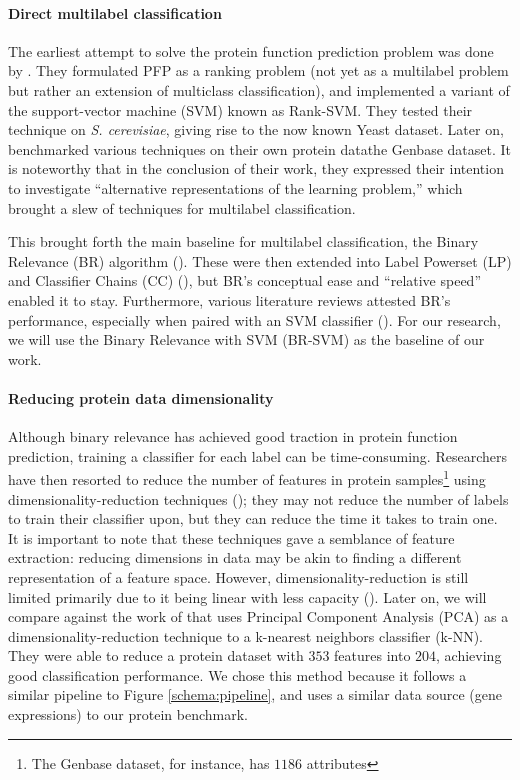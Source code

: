 \paragraph{Direct multilabel classification}
The earliest attempt to solve the protein function prediction problem was
done by \cite{elisseeff2001kernel}. They formulated PFP as a ranking problem
(not yet as a multilabel problem but rather an extension of multiclass
classification), and implemented a variant of the support-vector machine
(SVM) known as Rank-SVM. They tested their technique on \textit{S.
cerevisiae}, giving rise to the now known Yeast dataset. Later on,
\cite{diplaris2005protein} benchmarked various techniques on their own
protein data\textemdash the Genbase dataset. It is noteworthy that in the
conclusion of their work, they expressed their intention to investigate
``alternative representations of the learning problem,'' which brought a slew
of techniques for multilabel classification.

\par This brought forth the main baseline for multilabel classification, the
Binary Relevance (BR) algorithm
(\cite{godbole2004discriminative,tsoumakas2007multilabel}). These were then
extended into Label Powerset (LP) and Classifier Chains (CC)
(\cite{read2009classifier}), but BR's conceptual ease and ``relative speed''
enabled it to stay. Furthermore, various literature reviews attested BR's
performance, especially when paired with an SVM classifier
(\cite{luaces2012binary, zhang2014review,tsoumakas2017data}). For our
research, we will use the Binary Relevance with SVM (BR-SVM) as the baseline
of our work.

\paragraph{Reducing protein data dimensionality} Although binary relevance
has achieved good traction in protein function prediction, training a
classifier for each label can be time-consuming. Researchers have then
resorted to reduce the number of features in protein samples\footnote{The Genbase
dataset, for instance, has $1186$ attributes} using dimensionality-reduction
techniques (\cite{wang2009using, wang2013protein, wang2017protein}); they may
not reduce the number of labels to train their classifier upon, but they can
reduce the time it takes to train one. It is important to note that these
techniques gave a semblance of feature extraction: reducing dimensions in
data may be akin to finding a different representation of a feature space.
However, dimensionality-reduction is still limited primarily due to it being
linear with less capacity (\cite{cunningham2015linear}). Later on, we will
compare against the work of \cite{wang2013protein} that uses Principal
Component Analysis (PCA) as a dimensionality-reduction technique to a
k-nearest neighbors classifier (k-NN). They were able to reduce a protein
dataset with $353$ features into $204$, achieving good classification
performance. We chose this method because it follows a similar pipeline to
Figure \ref{schema:pipeline}, and uses a similar data source (gene
expressions) to our protein benchmark.

